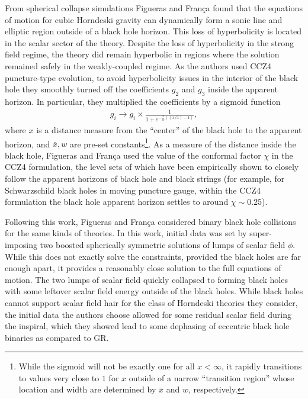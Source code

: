 \documentclass{ws-ijmpd}
\begin{document}
From spherical collapse simulations  
Figueras and Fran\c{c}a found that the equations of motion
for cubic Horndeski gravity can dynamically form
a sonic line and elliptic region outside of
a black hole horizon\cite{Figueras:2020dzx}.
This loss of hyperbolicity is located in the scalar sector of the theory.
Despite the loss of hyperbolicity in the strong field regime,
the theory did remain hyperbolic in regions where the solution
remained safely in the weakly-coupled regime.
As the authors used CCZ4 puncture-type evolution\cite{Andrade:2021rbd}, 
to avoid hyperbolicity
issues in the interior of the black hole they smoothly turned
off the coefficients $g_2$ and $g_3$ inside the apparent horizon.
In particular, they multiplied the coefficients by a sigmoid function
\begin{align}
   g_i
   \to
   g_i
   \times 
   \frac{1}{1 + e^{-\frac{2}{w}\left(\left(x/\bar{x}\right)-1\right)}}
   ,
\end{align}
where $x$ is a distance measure from the ``center'' of the black hole
to the apparent horizon, 
and $\bar{x},w$ are pre-set constants\footnote{While the sigmoid will
not be exactly one for all $x<\infty$, it rapidly transitions
to values very close to $1$ for $x$ outside of a narrow
``transition region'' whose location and width are
determined by $\bar{x}$ and $w$, respectively.}.
As a measure of the distance inside the black hole,
Figueras and Fran\c{c}a used the value of the conformal
factor $\chi$ in the CCZ4 formulation, the level sets of
which have been empirically shown to closely follow the
apparent horizons of black hole and black 
strings\cite{Bantilan:2019bvf,Andrade:2020dgc}
(for example, for Schwarzschild black holes in moving
puncture gauge, within the CCZ4 formulation the
black hole apparent horizon settles to around 
$\chi\sim0.25$\cite{Figueras:2020dzx}).

Following this work, Figueras and Fran\c{c}a considered
binary black hole collisions for the same kinds of 
theories\cite{Figueras:2021abd}.
In this work, initial data was set by super-imposing two boosted 
spherically symmetric solutions of lumps of scalar field $\phi$. 
While this does not exactly
solve the constraints, provided the black holes are far enough
apart, it provides a reasonably close solution to the full
equations of motion.
The two lumps of scalar field quickly collapsed to forming black holes
with some leftover scalar field energy outside of the black holes.
While black holes cannot support scalar field hair for the class of
Horndeski theories they consider\cite{Hui:2012qt,Maselli:2015yva}, 
the initial data the authors choose allowed
for some residual scalar field during the inspiral, which they showed 
lead to some dephasing of eccentric black hole binaries
as compared to GR\cite{Figueras:2021abd}.
\end{document}
